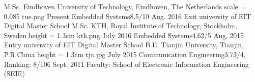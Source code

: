 %
%
%
%
%
% 
\begin{educations}
	\education
    {M.Sc.}			{Eindhoven University of Technology, Eindhoven, The Netherlands}
    {scale = 0.085}			{tue.png}
    {Present}		{Embedded Systems}{8.5/10}
    {Aug. 2016}		{Exit university of EIT Digital Master School}
    \universitySeparator
    \education
    {M.Sc.}			{KTH, Royal Institute of Technology, Stockholm, Sweden}
    {height = 1.3cm}			{kth.png}
    {July 2016}		{Embedded Systems}{4.62/5}
    {Aug. 2015}		{Entry university of EIT Digital Master School}
    \universitySeparator
    \education
    {B.E.}			{Tianjin University, Tianjin, P.R.China}
    {height = 1.3cm}			{tju.jpg}
    {July 2015}		{Communication Engineering}{3.73/4, Ranking: 8/106}
    {Sept. 2011}	{Faculty: School of Electronic Information Engineering (SEIE)}

\end{educations}
